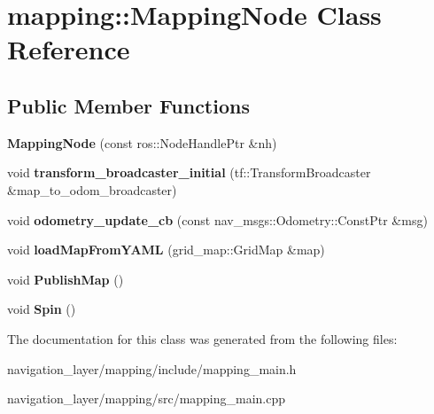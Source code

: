 \hypertarget{classmapping_1_1MappingNode}{}\section{mapping\+:\+:Mapping\+Node Class Reference}
\label{classmapping_1_1MappingNode}
\subsection*{Public Member Functions}
\begin{DoxyCompactItemize}
\item 
\mbox{\label{classmapping_1_1MappingNode_ac5e07918336fbd109fbb80602c112214}} 
{\bfseries Mapping\+Node} (const ros\+::\+Node\+Handle\+Ptr \&nh)
\item 
\mbox{\label{classmapping_1_1MappingNode_ac97adba70e05892c444fdd87aef2fafb}} 
void {\bfseries transform\+\_\+broadcaster\+\_\+initial} (tf\+::\+Transform\+Broadcaster \&map\+\_\+to\+\_\+odom\+\_\+broadcaster)
\item 
\mbox{\label{classmapping_1_1MappingNode_a4e4edc5fb06e25d5c6a38ff2aff0e81a}} 
void {\bfseries odometry\+\_\+update\+\_\+cb} (const nav\+\_\+msgs\+::\+Odometry\+::\+Const\+Ptr \&msg)
\item 
\mbox{\label{classmapping_1_1MappingNode_a2b033ee1388eacada84c9c4f50db1c36}} 
void {\bfseries load\+Map\+From\+Y\+A\+ML} (grid\+\_\+map\+::\+Grid\+Map \&map)
\item 
\mbox{\label{classmapping_1_1MappingNode_a802e71726ab46853b7d0c79c9b8294cd}} 
void {\bfseries Publish\+Map} ()
\item 
\mbox{\label{classmapping_1_1MappingNode_a84a3cf9f887abfe9d85cb6bd9d96365c}} 
void {\bfseries Spin} ()
\end{DoxyCompactItemize}


The documentation for this class was generated from the following files\+:\begin{DoxyCompactItemize}
\item 
navigation\+\_\+layer/mapping/include/mapping\+\_\+main.\+h\item 
navigation\+\_\+layer/mapping/src/mapping\+\_\+main.\+cpp\end{DoxyCompactItemize}
